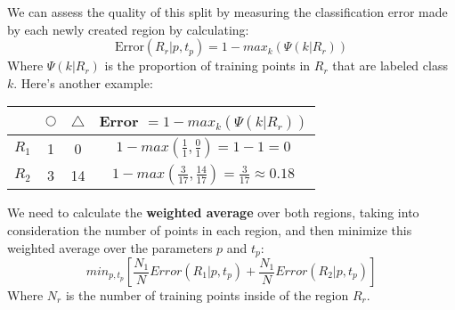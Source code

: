 \documentclass[10pt,a4paper]{report}
\begin{document}
We can assess the quality of this split by measuring the classification error made by each newly created region by calculating:
$$\textrm{Error}(R_r|p,t_p)= 1 - max_k(\Psi(k|R_r))$$
Where $\Psi(k|R_r)$ is the proportion of training points in $R_r$ that are labeled class $k$. Here's another example:\\
\begin{center}
\begin{tabular}{ |c|c|c|c| } 
 \hline
  & $\bigcirc$ & $\triangle$ & Error $= 1-max_k(\Psi(k|R_r))$\\\hline\hline
 $R_1$ & 1 & 0 & $1 - max(\frac{1}{1}, \frac{0}{1})= 1-1=0$\\\hline
 $R_2$ & 3 & 14 & $1 - max(\frac{3}{17}, \frac{14}{17}) = \frac{3}{17} \approx 0.18$\\\hline
\end{tabular}
\end{center}
We need to calculate the \textbf{weighted average} over both regions, taking into consideration the number of points in each region, and then minimize this weighted average over the parameters $p$ and $t_p$:
$$min_{p,t_p}\left[\frac{N_1}{N}Error(R_1|p,t_p)+\frac{N_1}{N}Error(R_2|p,t_p)\right]$$
Where $N_r$ is the number of training points inside of the region $R_r$.
\end{document}
